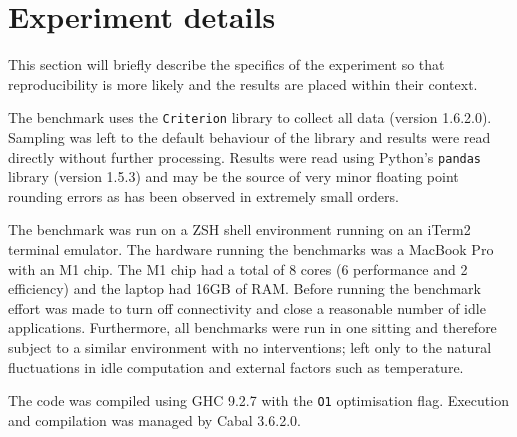\section{Experiment details}\label{sec:benchmark:experiment}
This section will briefly describe the specifics of the experiment so that
reproducibility is more likely and the results are placed within their context.

The benchmark uses the \verb|Criterion| library to collect all data (version
1.6.2.0). Sampling was left to the default behaviour of the library and results were
read directly without further processing. Results were read using Python's
\verb|pandas| library (version 1.5.3) and may be the source of very minor floating point
rounding errors as has been observed in extremely small orders.

The benchmark was run on a ZSH shell environment running on an iTerm2 terminal
emulator. The hardware running the benchmarks was a MacBook Pro with an M1 chip.
The M1 chip had a total of 8 cores (6 performance and 2 efficiency) and the
laptop had 16GB of RAM. Before running the benchmark effort was made to turn off
connectivity and close a reasonable number of idle applications. Furthermore,
all benchmarks were run in one sitting and therefore subject to a similar
environment with no interventions; left only to the natural fluctuations in idle
computation and external factors such as temperature.

The code was compiled using GHC 9.2.7 with the \verb|O1| optimisation flag.
Execution and compilation was managed by Cabal 3.6.2.0.
